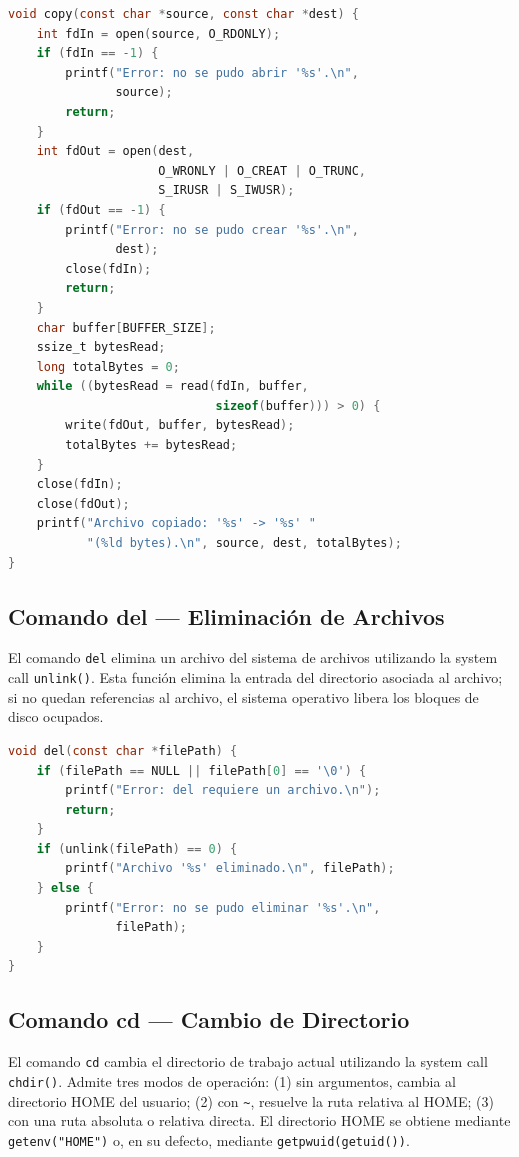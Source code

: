         \begin{lstlisting}[language=C, caption={Comando copy - Copia con buffer}]
void copy(const char *source, const char *dest) {
    int fdIn = open(source, O_RDONLY);
    if (fdIn == -1) {
        printf("Error: no se pudo abrir '%s'.\n",
               source);
        return;
    }
    int fdOut = open(dest,
                     O_WRONLY | O_CREAT | O_TRUNC,
                     S_IRUSR | S_IWUSR);
    if (fdOut == -1) {
        printf("Error: no se pudo crear '%s'.\n",
               dest);
        close(fdIn);
        return;
    }
    char buffer[BUFFER_SIZE];
    ssize_t bytesRead;
    long totalBytes = 0;
    while ((bytesRead = read(fdIn, buffer,
                             sizeof(buffer))) > 0) {
        write(fdOut, buffer, bytesRead);
        totalBytes += bytesRead;
    }
    close(fdIn);
    close(fdOut);
    printf("Archivo copiado: '%s' -> '%s' "
           "(%ld bytes).\n", source, dest, totalBytes);
}
        \end{lstlisting}

    \subsection{Comando del — Eliminación de Archivos}
        El comando \texttt{del} elimina un archivo del sistema de archivos utilizando la system call \texttt{unlink()}. Esta función elimina la entrada del directorio asociada al archivo; si no quedan referencias al archivo, el sistema operativo libera los bloques de disco ocupados.

        \begin{lstlisting}[language=C, caption={Comando del - Eliminación con unlink()}]
void del(const char *filePath) {
    if (filePath == NULL || filePath[0] == '\0') {
        printf("Error: del requiere un archivo.\n");
        return;
    }
    if (unlink(filePath) == 0) {
        printf("Archivo '%s' eliminado.\n", filePath);
    } else {
        printf("Error: no se pudo eliminar '%s'.\n",
               filePath);
    }
}
        \end{lstlisting}

    \subsection{Comando cd — Cambio de Directorio}
        El comando \texttt{cd} cambia el directorio de trabajo actual utilizando la system call \texttt{chdir()}. Admite tres modos de operación: (1) sin argumentos, cambia al directorio HOME del usuario; (2) con \texttt{\textasciitilde}, resuelve la ruta relativa al HOME; (3) con una ruta absoluta o relativa directa. El directorio HOME se obtiene mediante \texttt{getenv("HOME")} o, en su defecto, mediante \texttt{getpwuid(getuid())}.

